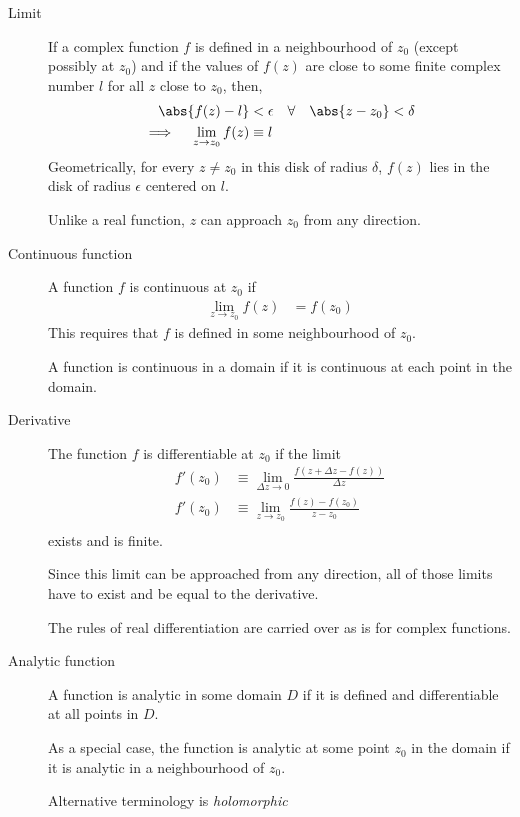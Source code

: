 \begin{description}
    \item[Limit] If a complex function $ f $ is defined in a neighbourhood of $ z_0 $
        (except possibly at $ z_0 $) and if the values of $ f(z) $ are close to some finite
        complex number $ l $ for all $ z $ close to $ z_0 $, then,
        \begin{align}
            \abs{f(z) - l}                       & < \epsilon &
            \forall \quad \abs{z - z_0} < \delta                \\
            \implies \quad \lim_{z \to z_0} f(z) & \equiv l
        \end{align}
        Geometrically, for every $ z \neq z_0 $ in this disk of radius $ \delta $,
        $ f(z) $ lies in the disk of radius $ \epsilon $ centered on $ l $. \par
        Unlike a real function, $ z $ can approach $ z_0 $ from any direction.

    \item[Continuous function] A function $ f $ is continuous at $ z_0 $ if
        \begin{align}
            \lim_{z \to z_0} f(z) & = f(z_0)
        \end{align}
        This requires that $ f $ is defined in some neighbourhood of $ z_0 $. \par
        A function is continuous in a domain if it is continuous at each point in the
        domain.

    \item[Derivative] The function $ f $ is differentiable at $ z_0 $ if the limit
        \begin{align}
            f'(z_0) & \equiv \lim_{\Delta z \to 0}
            \frac{f(z + \Delta z - f(z))}
            {\Delta z}                                             \\
            f'(z_0) & \equiv \lim_{z \to z_0} \frac{f(z) - f(z_0)}
            {z - z_0}                                              \\
        \end{align}
        exists and is finite. \par
        Since this limit can be approached from any direction, all of those limits have
        to exist and be equal to the derivative. \par
        The rules of real differentiation are carried over as is for complex functions.

    \item[Analytic function] A function is analytic in some domain $ D $ if it is defined
        and differentiable at all points in $ D $. \par
        As a special case, the function is analytic at some point $ z_0 $ in the
        domain if it is analytic in a neighbourhood of $ z_0 $. \par
        Alternative terminology is \emph{holomorphic}
\end{description}

